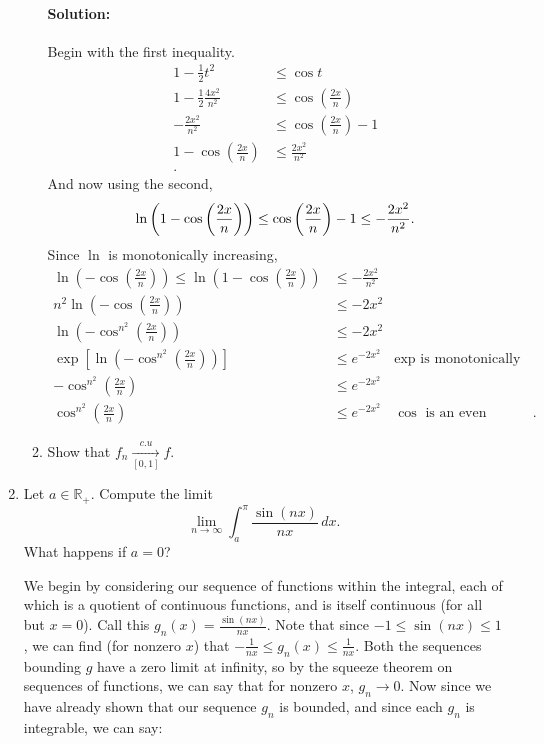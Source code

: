 \documentclass{article}
\begin{document}
\begin{enumerate}
\begin{enumerate}
        \paragraph{Solution: }Begin with the first inequality. 
        \begin{align*}
            1-\frac{1}{2}t^2&\leq \cos t\\
            1-\frac{1}{2}\frac{4x^2}{n^2}&\leq \cos\left( \frac{2x}{n} \right) \\
            -\frac{2x^2}{n^2}&\leq \cos\left( \frac{2x}{n} \right)-1 \\
            1-\cos\left( \frac{2x}{n} \right) &\leq\frac{2x^2}{n^2}\\
        .\end{align*}
        And now using the second,
        \[ \ln\left( 1-\cos\left( \frac{2x}{n} \right)  \right) \leq \cos\left( \frac{2x}{n} \right)-1 \leq -\frac{2x^2}{n^2}\\ .\] 
        Since $\ln$ is monotonically increasing,
        \begin{align*}
            \ln\left( -\cos\left( \frac{2x}{n} \right)  \right) \leq \ln\left( 1-\cos\left( \frac{2x}{n} \right)  \right) &\leq -\frac{2x^2}{n^2} \\
            n^2\ln\left( -\cos\left( \frac{2x}{n} \right)  \right) &\leq -2x^2 \\
            \ln\left( -\cos^{n^2}\left( \frac{2x}{n} \right)  \right) &\leq -2x^2\\
            \exp\left[   \ln\left( -\cos^{n^2}\left( \frac{2x}{n} \right)  \right) \right]&\leq e^{-2x^2}&\exp\text{ is monotonically increasing}\\
              -\cos^{n^2}\left( \frac{2x}{n} \right)  &\leq e^{-2x^2}\\
              \cos^{n^2}\left( \frac{2x}{n} \right)  &\leq e^{-2x^2}&\cos\text{ is an even function}
        .\end{align*}
    \item Show that $f_n\xrightarrow[{[0,1]}]{c.u}f$.
  \end{enumerate}

\item Let $a\in \mathbb{R}_{+}$. Compute the limit
  \[
  \lim_{n \to \infty} \int_{a}^{\pi} \frac{\sin(nx)}{nx} \, d x 
  .\] 
  What happens if $a=0$?

  We begin by considering our sequence of functions within the integral, each of which is a quotient of continuous functions, and is itself continuous (for all but $x=0$). Call this $g_n(x) =\frac{\sin(nx)}{nx}$. Note that since $-1\leq\sin(nx)\leq 1$, we can find (for nonzero $x$) that $-\frac{1}{nx}\leq g_n(x)\leq \frac{1}{nx}$. Both the sequences bounding $g$ have a zero limit at infinity, so by the squeeze theorem on sequences of functions, we can say that for nonzero $x$, $g_n\to 0$.
  Now since we have already shown that our sequence $g_n$ is bounded, and since each $g_n$ is integrable, we can say:


\end{enumerate}
\end{document}
